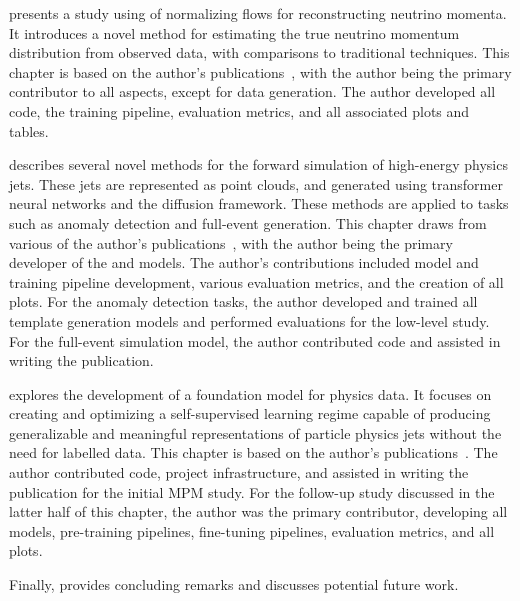  presents a study using of normalizing flows for reconstructing neutrino momenta.
It introduces a novel method for estimating the true neutrino momentum distribution from observed data, with comparisons to traditional techniques.
This chapter is based on the author's publications~\cite{Nu2Flows,NuFlows1}, with the author being the primary contributor to all aspects, except for data generation.
The author developed all code, the training pipeline, evaluation metrics, and all associated plots and tables.

 describes several novel methods for the forward simulation of high-energy physics jets.
These jets are represented as point clouds, and generated using transformer neural networks and the diffusion framework.
These methods are applied to tasks such as anomaly detection and full-event generation.
This chapter draws from various of the author's publications~\cite{PCJedi,PCDroid,EpicJedi,Drapes,PIPPIN}, with the author being the primary developer of the \pcjedi and \pcdroid models.
The author's contributions included model and training pipeline development, various evaluation metrics, and the creation of all plots.
For the anomaly detection tasks, the author developed and trained all template generation models and performed evaluations for the low-level study.
For the full-event simulation model, the author contributed code and assisted in writing the publication.

 explores the development of a foundation model for physics data.
It focuses on creating and optimizing a self-supervised learning regime capable of producing generalizable and meaningful representations of particle physics jets without the need for labelled data.
This chapter is based on the author's publications~\cite{MPM,MPM2}.
The author contributed code, project infrastructure, and assisted in writing the publication for the initial MPM study.
For the follow-up study discussed in the latter half of this chapter, the author was the primary contributor, developing all models, pre-training pipelines, fine-tuning pipelines, evaluation metrics, and all plots.

Finally,  provides concluding remarks and discusses potential future work.
